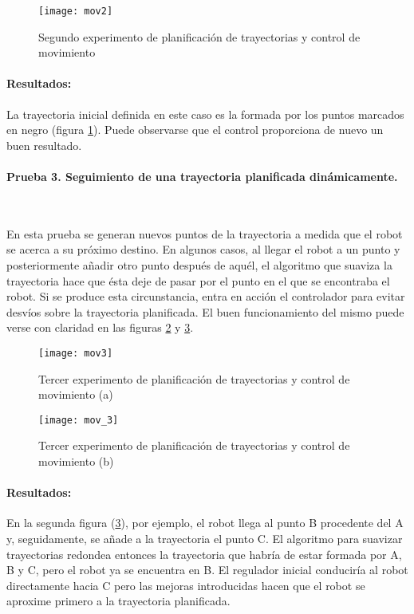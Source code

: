 \begin{figure}[h]
  \centering\texttt{[image: mov2]}\\
  \caption{Segundo experimento de planificación de trayectorias y control de movimiento}\label{fg:mov2}
\end{figure}

\paragraph{Resultados:}
La trayectoria inicial definida en este caso es la formada por los puntos marcados en negro (figura \ref{fg:mov2}). Puede observarse que el control proporciona de nuevo un buen resultado.

\paragraph{Prueba 3. Seguimiento de una trayectoria planificada dinámicamente.}\ %

\noindent
En esta prueba se generan nuevos puntos de la trayectoria a medida que el robot se acerca a su próximo destino. En algunos casos, al llegar el robot a un punto y posteriormente añadir otro punto después de aquél, el algoritmo que suaviza la trayectoria hace que ésta deje de pasar por el punto en el que se encontraba el robot. Si se produce esta circunstancia, entra en acción el controlador para evitar desvíos sobre la trayectoria planificada. El buen funcionamiento del mismo puede verse con claridad en las figuras \ref{fg:mov3a} y \ref{fg:mov3b}.

\begin{figure}[hbt]
  \centering\texttt{[image: mov3]}\\
    \caption{Tercer experimento de planificación de trayectorias y control de movimiento (a)}\label{fg:mov3a}
\end{figure}
 
 \begin{figure}[hbt]
\centering\texttt{[image: mov\_3]}
\caption{Tercer experimento de planificación de trayectorias y control de movimiento (b)}\label{fg:mov3b}
\end{figure}

\paragraph{Resultados:}

En la segunda figura (\ref{fg:mov3b}), por ejemplo, el robot llega al punto B procedente del A y, seguidamente, se añade a la trayectoria el punto C. El algoritmo para suavizar trayectorias redondea entonces la trayectoria que habría de estar formada por A, B y C, pero el robot ya se encuentra en B. El regulador inicial conduciría al robot directamente hacia C pero las mejoras introducidas hacen que el robot se aproxime primero a la trayectoria planificada.

